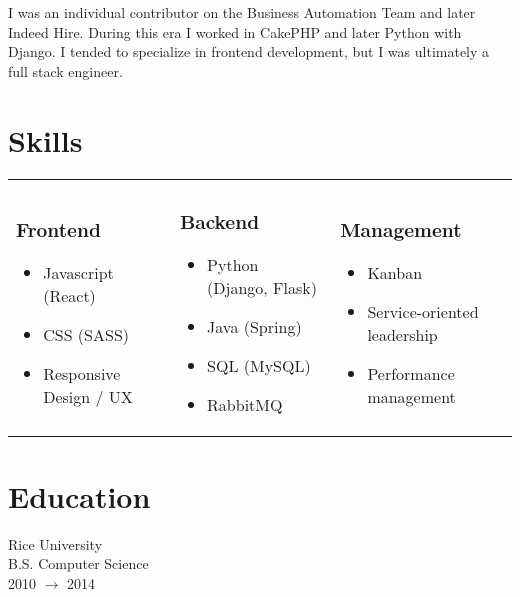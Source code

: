 \documentclass[11pt]{amsart}
\begin{document}
%
%
\begin{tcolorbox}[
	title=Software Engineer \textcolor{DarkGray}{/} Indeed,
	after title={\hfill2014 \textcolor{DarkGray}{$\rightarrow$} 2017 \textcolor{DarkGray}{(3 years)}}
]
I was an individual contributor on the Business Automation Team and later Indeed Hire. During this era I worked in CakePHP and later Python with Django. I tended to specialize in frontend development, but I was ultimately a full stack engineer.
\end{tcolorbox}

\section{Skills}
\begin{tabularx}{\textwidth}{X X X}
{
	\subsubsection{Frontend}
	\begin{itemize}[noitemsep, leftmargin=1em, label=\raisebox{0.25ex}{\tiny$\bullet$}]
		\item Javascript (React)
		\item CSS (SASS)
		\item Responsive Design / UX
	\end{itemize}
}&
{
	\subsubsection{Backend}
	\begin{itemize}[noitemsep, leftmargin=1em, label=\raisebox{0.25ex}{\tiny$\bullet$}]
		\item Python (Django, Flask)
		\item Java (Spring)
		\item SQL (MySQL)
		\item RabbitMQ
	\end{itemize}
}&
{
	\subsubsection{Management}
	\begin{itemize}[noitemsep, leftmargin=1em, label=\raisebox{0.25ex}{\tiny$\bullet$}]
		\item Kanban
		\item Service-oriented leadership
		\item Performance management
	\end{itemize}
}
\end{tabularx}

\section{Education}
 
Rice University \\
B.S. Computer Science \\
 2010 $\rightarrow$  2014

\end{document}
